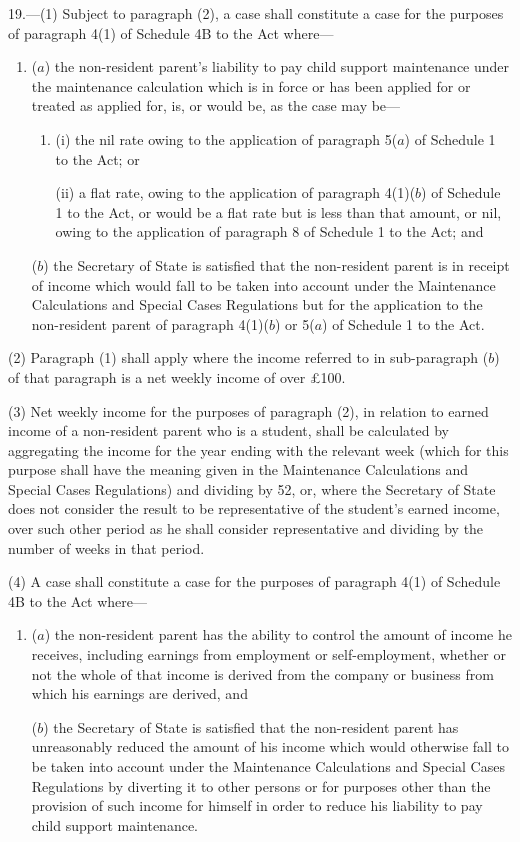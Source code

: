 \documentclass[12pt,a4paper]{article}
\begin{document}
19.---(1)  Subject to paragraph (2), a case shall constitute a case for the purposes of paragraph 4(1) of Schedule 4B to the Act where—
\begin{enumerate}\item[]
($a$) the non-resident parent’s liability to pay child support maintenance under the maintenance calculation which is in force or has been applied for or treated as applied for, is, or would be, as the case may be—
\begin{enumerate}\item[]
(i) the nil rate owing to the application of paragraph 5($a$)  of Schedule 1 to the Act; or

(ii) a flat rate, owing to the application of paragraph 4(1)($b$)  of Schedule 1 to the Act, or would be a flat rate but is less than that amount, or nil, owing to the application of paragraph 8 of Schedule 1 to the Act; and
\end{enumerate}

($b$) the Secretary of State is satisfied that the non-resident parent is in receipt of income which would fall to be taken into account under the Maintenance Calculations and Special Cases Regulations but for the application to the non-resident parent of paragraph 4(1)($b$)  or 5($a$)  of Schedule 1 to the Act.
\end{enumerate}

(2) Paragraph (1) shall apply where the income referred to in sub-paragraph ($b$)  of that paragraph is a net weekly income of over £100.

(3) Net weekly income for the purposes of paragraph (2), in relation to earned income of a non-resident parent who is a student, shall be calculated by aggregating the income for the year ending with the relevant week (which for this purpose shall have the meaning given in the Maintenance Calculations and Special Cases Regulations) and dividing by 52, or, where the Secretary of State does not consider the result to be representative of the student’s earned income, over such other period as he shall consider representative and dividing by the number of weeks in that period.

(4) A case shall constitute a case for the purposes of paragraph 4(1) of Schedule 4B to the Act where—
\begin{enumerate}\item[]
($a$) the non-resident parent has the ability to control the amount of income he receives, including earnings from employment or self-employment, whether or not the whole of that income is derived from the company or business from which his earnings are derived, and

($b$) the Secretary of State is satisfied that the non-resident parent has unreasonably reduced the amount of his income which would otherwise fall to be taken into account under the Maintenance Calculations and Special Cases Regulations by diverting it to other persons or for purposes other than the provision of such income for himself in order to reduce his liability to pay child support maintenance.
\end{enumerate}
\end{document}
